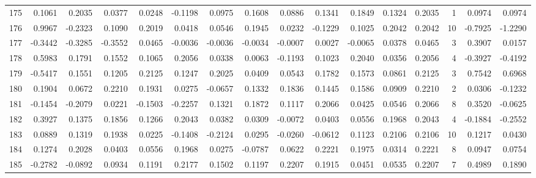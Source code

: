 \begin{tabular}{lrrrrrrrrrrrrrrr}
175 &      0.1061 &  0.2035 &  0.0377 &  0.0248 & -0.1198 &  0.0975 &  0.1608 &  0.0886 &  0.1341 &  0.1849 &   0.1324 &     0.2035 &      1 &                    0.0974 &                     0.0974 \\
176 &      0.9967 & -0.2323 &  0.1090 &  0.2019 &  0.0418 &  0.0546 &  0.1945 &  0.0232 & -0.1229 &  0.1025 &   0.2042 &     0.2042 &     10 &                   -0.7925 &                    -1.2290 \\
177 &     -0.3442 & -0.3285 & -0.3552 &  0.0465 & -0.0036 & -0.0036 & -0.0034 & -0.0007 &  0.0027 & -0.0065 &   0.0378 &     0.0465 &      3 &                    0.3907 &                     0.0157 \\
178 &      0.5983 &  0.1791 &  0.1552 &  0.1065 &  0.2056 &  0.0338 &  0.0063 & -0.1193 &  0.1023 &  0.2040 &   0.0356 &     0.2056 &      4 &                   -0.3927 &                    -0.4192 \\
179 &     -0.5417 &  0.1551 &  0.1205 &  0.2125 &  0.1247 &  0.2025 &  0.0409 &  0.0543 &  0.1782 &  0.1573 &   0.0861 &     0.2125 &      3 &                    0.7542 &                     0.6968 \\
180 &      0.1904 &  0.0672 &  0.2210 &  0.1931 &  0.0275 & -0.0657 &  0.1332 &  0.1836 &  0.1445 &  0.1586 &   0.0909 &     0.2210 &      2 &                    0.0306 &                    -0.1232 \\
181 &     -0.1454 & -0.2079 &  0.0221 & -0.1503 & -0.2257 &  0.1321 &  0.1872 &  0.1117 &  0.2066 &  0.0425 &   0.0546 &     0.2066 &      8 &                    0.3520 &                    -0.0625 \\
182 &      0.3927 &  0.1375 &  0.1856 &  0.1266 &  0.2043 &  0.0382 &  0.0309 & -0.0072 &  0.0403 &  0.0556 &   0.1968 &     0.2043 &      4 &                   -0.1884 &                    -0.2552 \\
183 &      0.0889 &  0.1319 &  0.1938 &  0.0225 & -0.1408 & -0.2124 &  0.0295 & -0.0260 & -0.0612 &  0.1123 &   0.2106 &     0.2106 &     10 &                    0.1217 &                     0.0430 \\
184 &      0.1274 &  0.2028 &  0.0403 &  0.0556 &  0.1968 &  0.0275 & -0.0787 &  0.0622 &  0.2221 &  0.1975 &   0.0314 &     0.2221 &      8 &                    0.0947 &                     0.0754 \\
185 &     -0.2782 & -0.0892 &  0.0934 &  0.1191 &  0.2177 &  0.1502 &  0.1197 &  0.2207 &  0.1915 &  0.0451 &   0.0535 &     0.2207 &      7 &                    0.4989 &                     0.1890 \\

\end{tabular}
